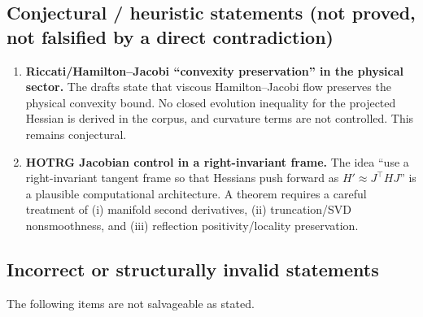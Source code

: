 \documentclass[11pt]{article}
\begin{document}
\subsection*{Conjectural / heuristic statements (not proved, not falsified by a direct contradiction)}
\begin{enumerate}[leftmargin=*]
\item \textbf{Riccati/Hamilton--Jacobi ``convexity preservation'' in the physical sector.}
The drafts state that viscous Hamilton--Jacobi flow preserves the physical convexity bound.
No closed evolution inequality for the projected Hessian is derived in the corpus, and curvature terms are not controlled.
This remains conjectural.

\item \textbf{HOTRG Jacobian control in a right-invariant frame.}
The idea ``use a right-invariant tangent frame so that Hessians push forward as $H'\approx J^\top HJ$'' is a plausible computational architecture.
A theorem requires a careful treatment of (i) manifold second derivatives, (ii) truncation/SVD nonsmoothness, and (iii) reflection positivity/locality preservation.
\end{enumerate}

\subsection*{Incorrect or structurally invalid statements}
The following items are not salvageable as stated.
\end{document}
